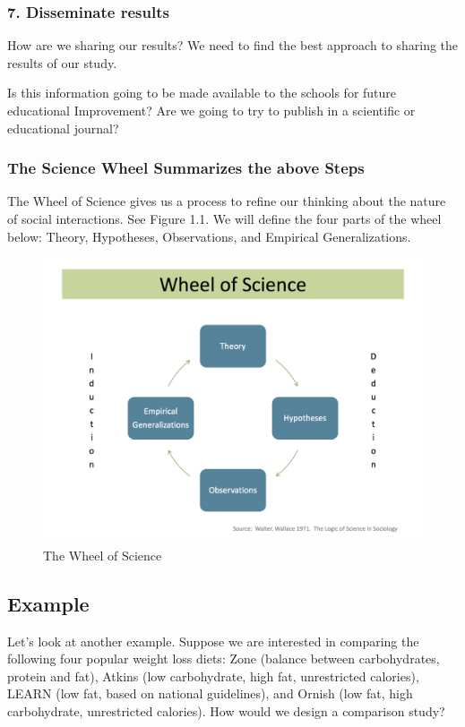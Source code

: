 \documentclass[11pt, chapterprefix=true]{scrbook}\usepackage[]{graphicx}\usepackage[]{color}
\begin{document}
\subsubsection{7. Disseminate results}

How are we sharing our results?  We need to find the best approach to sharing the results of our study.

Is this information going to be made available to the schools for future educational Improvement?  Are we going to try to publish in a scientific or educational journal?

\subsubsection{The Science Wheel Summarizes the above Steps}

The Wheel of Science  \citep{Wallace1971}
gives us a process to refine our thinking about the nature of social interactions.  See Figure 1.1.  We will define the four parts of the wheel below:  Theory, Hypotheses, Observations, and Empirical Generalizations.

\begin{figure}[htbp]
   \centering

\includegraphics[width=0.5\linewidth]{chapters/Chapter_1/ext_figure/zWheel_Science.png} %

   \caption{The Wheel of Science}
   \label{fig:WS}
\end{figure}

\subsection{Example}

Let's look at another example.  Suppose we are interested in comparing the following four popular weight loss diets: Zone (balance between carbohydrates, protein and fat), Atkins (low carbohydrate, high fat, unrestricted calories), LEARN (low fat, based on national guidelines), and Ornish (low fat, high carbohydrate, unrestricted calories).   How would we design a comparison study?
\end{document}
